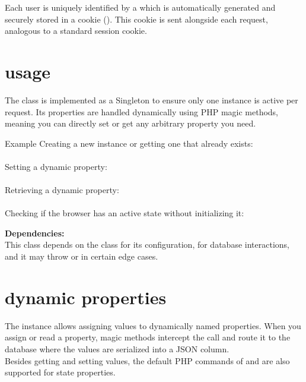 \documentclass[12pt]{article} %
\begin{document}
    Each user is uniquely identified by a  which is automatically generated and securely stored in a cookie (). This cookie is sent alongside each request, analogous to a standard session cookie.


    \section{usage}\label{sec:usage}

    The class is implemented as a Singleton to ensure only one instance is active per request. Its properties are handled dynamically using PHP magic methods, meaning you can directly set or get any arbitrary property you need.\\

    \begin{exampleBox}{Example}
        Creating a new instance or getting one that already exists:\\[0.1cm]
        \\[0.5cm]
        Setting a dynamic property:\\[0.1cm]
        \\[0.5cm]
        Retrieving a dynamic property:\\[0.1cm]
        \\[0.5cm]
        Checking if the browser has an active state without initializing it:\\[0.1cm]
    \end{exampleBox}
    
    \vspace{0.5cm}
    \textbf{Dependencies:}\\
    This class depends on the  class for its configuration,  for database interactions, and it may throw  or  in certain edge cases.\\


    \section{dynamic properties}\label{sec:dynamic_properties}
    
    The  instance allows assigning values to dynamically named properties. When you assign or read a property, magic methods intercept the call and route it to the database where the values are serialized into a JSON column.\\
    Besides getting and setting values, the default PHP commands of  and  are also supported for state properties.
    
\end{document}
